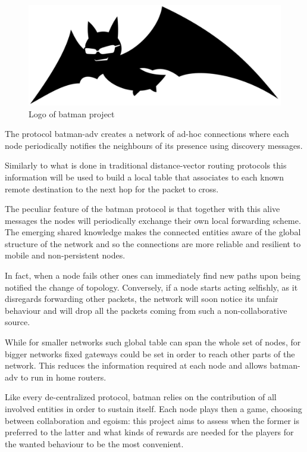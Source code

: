 \documentclass[conference]{IEEEtran}
\begin{document}
\begin{figure}[h]
  \centering
  \includegraphics[width=0.8\linewidth]{figures/logo.pdf}
  \caption{Logo of \gls{batman} project}
  \label{fig:batman_logo}
\end{figure}

\smallskip


The protocol \gls{batman}-adv creates a network of ad-hoc connections where each node periodically notifies the neighbours of its presence using discovery messages.

Similarly to what is done in traditional distance-vector routing protocols this information will be used to build a local table that associates to each known remote destination to the next hop for the packet to cross.

The peculiar feature of the \gls{batman} protocol is that together with this alive messages the nodes will periodically exchange their own local forwarding scheme. The emerging shared knowledge makes the connected entities aware of the global structure of the network and so the connections are more reliable and resilient to mobile and non-persistent nodes.

In fact, when a node fails other ones can immediately find new paths upon being notified the change of topology.
Conversely, if a node starts acting selfishly, as it disregards forwarding other packets, the network will soon notice its unfair behaviour and will drop all the packets coming from such a non-collaborative source.

While for smaller networks such global table can span the whole set of nodes, for bigger networks fixed gateways could be set in order to reach other parts of the network. This reduces the information required at each node and allows \gls{batman}-adv to run in home routers.

\smallskip

Like every de-centralized protocol, \gls{batman} relies on the contribution of all involved entities in order to sustain itself. Each node plays then a game, choosing between collaboration and egoism: this project aims to assess when the former is preferred to the latter and what kinds of rewards are needed for the players for the wanted behaviour to be the most convenient.
\end{document}
